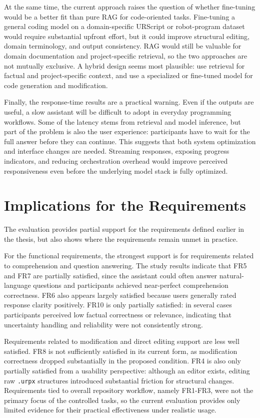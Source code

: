 At the same time, the current approach raises the question of whether fine-tuning would be a better fit than pure RAG for code-oriented tasks. Fine-tuning a general coding model on a domain-specific URScript or robot-program dataset would require substantial upfront effort, but it could improve structural editing, domain terminology, and output consistency. RAG would still be valuable for domain documentation and project-specific retrieval, so the two approaches are not mutually exclusive. A hybrid design seems most plausible: use retrieval for factual and project-specific context, and use a specialized or fine-tuned model for code generation and modification.

Finally, the response-time results are a practical warning. Even if the outputs are useful, a slow assistant will be difficult to adopt in everyday programming workflows. Some of the latency stems from retrieval and model inference, but part of the problem is also the user experience: participants have to wait for the full answer before they can continue. This suggests that both system optimization and interface changes are needed. Streaming responses, exposing progress indicators, and reducing orchestration overhead would improve perceived responsiveness even before the underlying model stack is fully optimized.

\section{Implications for the Requirements}
The evaluation provides partial support for the requirements defined earlier in the thesis, but also shows where the requirements remain unmet in practice.

For the functional requirements, the strongest support is for requirements related to comprehension and question answering. The study results indicate that FR5 and FR7 are partially satisfied, since the assistant could often answer natural-language questions and participants achieved near-perfect comprehension correctness. FR6 also appears largely satisfied because users generally rated response clarity positively. FR10 is only partially satisfied: in several cases participants perceived low factual correctness or relevance, indicating that uncertainty handling and reliability were not consistently strong.

Requirements related to modification and direct editing support are less well satisfied. FR8 is not sufficiently satisfied in its current form, as modification correctness dropped substantially in the proposed condition. FR4 is also only partially satisfied from a usability perspective: although an editor exists, editing raw \texttt{.urpx} structures introduced substantial friction for structural changes. Requirements tied to overall repository workflow, namely FR1-FR3, were not the primary focus of the controlled tasks, so the current evaluation provides only limited evidence for their practical effectiveness under realistic usage.

